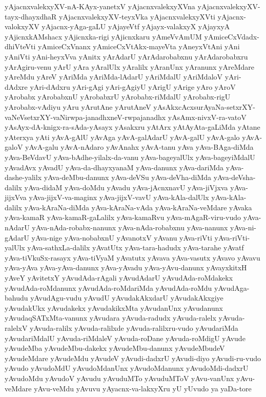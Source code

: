 {yAjacnxvalekxyXV-nA-KAyx-yanetxV
yAjacnxvalekxyXVna
yAjacnxvalekxyXV-tayx-dhayxdhaR
yAjacnxvalekxyXV-teyxVka
yAjacnxvalekxyXVti
yAjacnx-valokxyXV
yAjacnx-yAga-gaLU
yAjayeVtf
yAjayx-valakxyX
yAjayxyA
yAjicnxkAMshacx
yAjicnxka-rigi
yAjicnxkaru
yAmeVvAmUM
yAmiceCxVdadx-dhiVteVti
yAmiceCxVnanx
yAmiceCxVtAkx-mayeVta
yAneyxVtAni
yAni
yAniVti
yAni-heyxVva
yAnitx
yArAdarU
yArAdarobabxnu
yArAdarobabxru
yArAgiru-venu
yArU
yAra
yAralUlx
yAralilx
yAranUnx
yAranunx
yAreMdare
yAreMdu
yAreV
yAriMda
yAriMda-lAdarU
yAriMdalU
yAriMdaloV
yAri-dAdxre
yAri-dAdxru
yAri-gAgi
yAri-gAgiyU
yArigU
yArige
yAro
yAroV
yArobabx
yArobabxnU
yArobabxrU
yArobabx-riMdalU
yArobabx-rigU
yArobabx-vAdiyu
yAru
yArutAne
yArutAneV
yAsAkxcAcxsurAyaNa-setxrXY-vaNeVsetxrXY-vaNirwpa-janadhxneV-rwpajanadhx
yAsAmx-nivxV-ra-vatoV
yAsAyx-dA-knigx-ra-sAda-yAsayx
yAsakxru
yAtArx
yAtAyAta-gaLiMda
yAtane
yAterxya
yAti
yAvA-gAlU
yAvAga
yAvA-galAdarU
yAvA-galU
yAvA-galo
yAvA-galoV
yAvA-galu
yAvA-nAdaro
yAvAnahx
yAvA-tanu
yAva
yAva-BAga-diMda
yAva-BeVdavU
yAva-bAdhe-yilalx-da-vanu
yAva-bageyalUlx
yAva-bageyiMdalU
yAvadAvx
yAvadU
yAva-da-dhayxyanaM
yAva-danunx
yAva-dariMda
yAva-dashe-yalilx
yAva-deMbu-danunx
yAva-deVSu
yAva-deVha-diMda
yAva-deVsha-dalilx
yAva-didaM
yAva-doMdu
yAvadu
yAva-jAcnxnavU
yAva-jiVjxva
yAva-jijxVva
yAva-jijxV-va-maginx
yAva-jijxV-vavU
yAva-kAla-dalUlx
yAva-kAla-dalilx
yAva-kAraNa-diMda
yAva-kAraNa-vAda
yAva-kAraNa-veMdare
yAvaka
yAva-kamaR
yAva-kamaR-gaLalilx
yAva-kamaRvu
yAva-mAgaR-viru-vudo
yAva-nAdarU
yAva-nAda-robabx-nanunx
yAva-nAda-robabxnu
yAva-nanunx
yAva-ni-gAdarU
yAva-nige
yAva-nobabxnU
yAvanotxV
yAvanu
yAva-riVti
yAva-riVti-yalUlx
yAva-sathxLa-dalilx
yAvatUtx
yAva-tara-hadudx
yAva-tarahe
yAvatf
yAva-tiVkuSx-rasayx
yAva-tiVyaM
yAvatutx
yAvava
yAva-vasutx
yAvavo
yAvavu
yAva-yAva
yAva-yAva-danunx
yAva-yAvadu
yAva-yAvu-danunx
yAvayxkitxH
yAveY
yAvitetxY
yAvudAda-rAgali
yAvudAdarU
yAvudAda-roMdakekx
yAvudAda-roMdanunx
yAvudAda-roMdariMda
yAvudAda-roMdu
yAvudAga-bahudu
yAvudAgu-vudu
yAvudU
yAvudakAkxdarU
yAvudakAkxgiye
yAvudakUkx
yAvudakekx
yAvudakikxMta
yAvudanUnx
yAvudanunx
yAvudaqSATxMta-vanunx
yAvudara
yAvuda-radudx
yAvuda-ralelx
yAvuda-ralelxV
yAvuda-ralilx
yAvuda-ralilxde
yAvuda-ralilxru-vudo
yAvudariMda
yAvudariMdalU
yAvuda-riMdaleV
yAvuda-roDane
yAvuda-roMdigU
yAvude
yAvudeMba
yAvudeMbu-dakekx
yAvudeMbu-danunx
yAvudeMbudeV
yAvudeMdare
yAvudeMdu
yAvudeV
yAvudi-dadxrU
yAvudi-diyo
yAvudi-ru-vudo
yAvudo
yAvudoMdU
yAvudoMdanUnx
yAvudoMdanunx
yAvudoMdi-dadxrU
yAvudoMdu
yAvudoV
yAvudu
yAvuduMTo
yAvuduMToV
yAvu-vanUnx
yAvu-veMdare
yAvu-veMdu
yAvuvu
yAyacnx-va-lakxyXru
yU
yUvudo
ya
yaDa-tore
}
